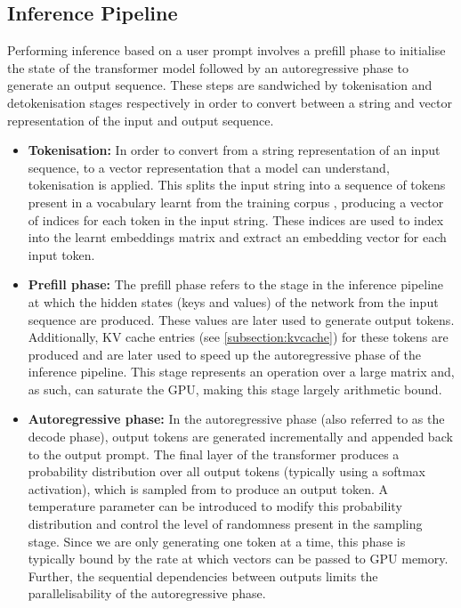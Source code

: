 \documentclass[12pt,twoside]{report}
\begin{document}
\subsection{Inference Pipeline}\label{subsection:inferencepipeline}
Performing inference based on a user prompt involves a prefill phase to initialise the state of the transformer model followed by an autoregressive phase to generate an output sequence.
These steps are sandwiched by tokenisation and detokenisation stages respectively in order to convert between a string and vector representation of the input and output sequence.
\begin{itemize}
  \item \textbf{Tokenisation:}
    In order to convert from a string representation of an input sequence, to a vector representation that a model can understand, tokenisation is applied.
    This splits the input string into a sequence of tokens present in a vocabulary learnt from the training corpus \cite{radford2019language} \cite{sennrich2015neural}, producing a vector of indices for each token in the input string.
    These indices are used to index into the learnt embeddings matrix and extract an embedding vector for each input token.
  \item \textbf{Prefill phase:}
    The prefill phase refers to the stage in the inference pipeline at which the hidden states (keys and values) of the network from the input sequence are produced.
    These values are later used to generate output tokens.
    Additionally, KV cache entries (see \ref{subsection:kvcache}) for these tokens are produced and are later used to speed up the autoregressive phase of the inference pipeline.
    This stage represents an operation over a large matrix and, as such, can saturate the GPU, making this stage largely arithmetic bound.
  \item \textbf{Autoregressive phase:}
    In the autoregressive phase (also referred to as the decode phase), output tokens are generated incrementally and appended back to the output prompt. 
    The final layer of the transformer produces a probability distribution over all output tokens (typically using a softmax activation), which is sampled from to produce an output token.
    A temperature parameter can be introduced to modify this probability distribution and control the level of randomness present in the sampling stage.
    Since we are only generating one token at a time, this phase is typically bound by the rate at which vectors can be passed to GPU memory.
    Further, the sequential dependencies between outputs limits the parallelisability of the autoregressive phase.

\end{itemize}
\end{document}
